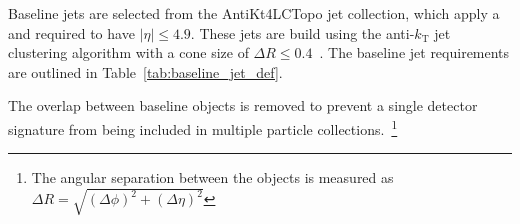 \begin{table}[ht]
  \caption{Baseline muon requirements.}
  \label{tab:baseline_mu_def}
\end{table}

Baseline jets are selected from the AntiKt4LCTopo jet collection, which apply a
and required to have $|\eta| \leq 4.9$.
These jets are build using the anti-$k_\mathrm{T}$ jet clustering algorithm
with a cone size of $\Delta R \leq 0.4$~\cite{Cacciari:2008gp}.
The baseline jet requirements are outlined in Table~\ref{tab:baseline_jet_def}.

\begin{table}[ht]
    \caption{Baseline jet requirements.}
    \label{tab:baseline_jet_def}
\end{table}

The overlap between baseline objects is removed to prevent a single
detector signature from being included in multiple particle
collections.~\footnote{The angular separation between the objects is measured
as $\Delta R = \sqrt{(\Delta \phi)^2 + (\Delta \eta)^2}$}

